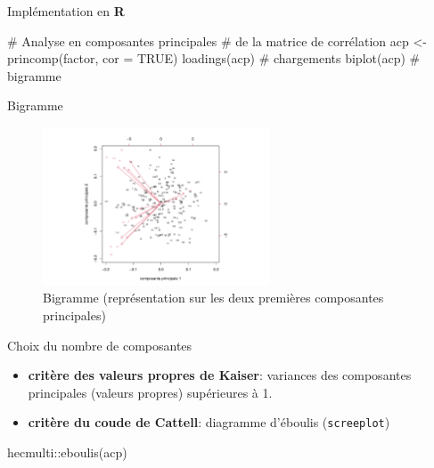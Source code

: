 \documentclass[
  ignorenonframetext,
]{beamer}
\newenvironment{Shaded}{\begin{snugshade}}{\end{snugshade}}
\newcommand{\AttributeTok}[1]{\textcolor[rgb]{0.40,0.45,0.13}{#1}}
\newcommand{\CommentTok}[1]{\textcolor[rgb]{0.37,0.37,0.37}{#1}}
\newcommand{\ConstantTok}[1]{\textcolor[rgb]{0.56,0.35,0.01}{#1}}
\newcommand{\FunctionTok}[1]{\textcolor[rgb]{0.28,0.35,0.67}{#1}}
\newcommand{\NormalTok}[1]{\textcolor[rgb]{0.00,0.23,0.31}{#1}}
\newcommand{\OtherTok}[1]{\textcolor[rgb]{0.00,0.23,0.31}{#1}}
\newcommand{\SpecialCharTok}[1]{\textcolor[rgb]{0.37,0.37,0.37}{#1}}
\providecommand{\tightlist}{%
  \setlength{\itemsep}{0pt}\setlength{\parskip}{0pt}}\usepackage{longtable,booktabs,array}
\begin{document}
\begin{frame}[fragile]{Implémentation en \textbf{R}}
\protect\hypertarget{impluxe9mentation-en-r}{}
\begin{Shaded}
\begin{Highlighting}[]
\CommentTok{\# Analyse en composantes principales}
\CommentTok{\# de la matrice de corrélation}
\NormalTok{acp }\OtherTok{\textless{}{-}} \FunctionTok{princomp}\NormalTok{(factor, }\AttributeTok{cor =} \ConstantTok{TRUE}\NormalTok{)}
\FunctionTok{loadings}\NormalTok{(acp) }\CommentTok{\# chargements}
\FunctionTok{biplot}\NormalTok{(acp) }\CommentTok{\# bigramme}
\end{Highlighting}
\end{Shaded}
\end{frame}

\begin{frame}{Bigramme}
\protect\hypertarget{bigramme}{}
\begin{figure}

{\centering \includegraphics[width=0.6\textwidth,height=\textheight]{MATH60602-diapos3_files/figure-beamer/fig-bigramme-1.pdf}

}

\caption{\label{fig-bigramme}Bigramme (représentation sur les deux
premières composantes principales)}

\end{figure}
\end{frame}

\begin{frame}[fragile]{Choix du nombre de composantes}
\protect\hypertarget{choix-du-nombre-de-composantes}{}
\begin{itemize}
\tightlist
\item
  \textbf{critère des valeurs propres de Kaiser}: variances des
  composantes principales (valeurs propres) supérieures à 1.
\item
  \textbf{critère du coude de Cattell}: diagramme d'éboulis
  (\texttt{screeplot})
\end{itemize}

\begin{Shaded}
\begin{Highlighting}[]
\NormalTok{hecmulti}\SpecialCharTok{::}\FunctionTok{eboulis}\NormalTok{(acp)}
\end{Highlighting}
\end{Shaded}
\end{frame}
\end{document}
